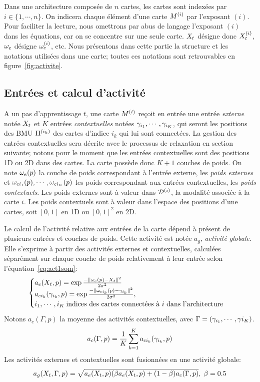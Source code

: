 Dans une architecture composée de $n$ cartes, les cartes sont indexées par $i \in \{1,\cdots,n\}$. On indicera chaque élément d'une carte $M^{({i})}$ par l'exposant $(i)$. Pour faciliter la lecture, nous omettrons par abus de langage l'exposant $(i)$ dans les équations, car on se concentre sur une seule carte. $X_t$ désigne donc $X_t^{({i})}$, $\omega_e$ désigne $\omega_e^{({i})}$, etc.
Nous présentons dans cette partie la structure et les notations utilisées dans une carte; toutes ces notations sont retrouvables en figure~\ref{fig:activite}.

\subsection{Entrées et calcul d'activité}
A un pas d'apprentissage $t$, une carte $M^{({i})}$ reçoit en entrée une entrée \emph{externe} notée $X_t$ et $K$ entrées \emph{contextuelles} notées $\gamma_{i_1},\cdots,\gamma_{i_K}$, qui seront les positions des BMU $\Pi^{({i_k})}$ des cartes d'indice $i_k$ qui lui sont connectées. La gestion des entrées contextuelles sera décrite avec le processus de relaxation en section suivante; notons pour le moment que les entrées contextuelles sont des positions 1D ou 2D dans des cartes. 
La carte possède donc $K+1$ couches de poids. On  note $\omega_e(p)$ la couche de poids correspondant à l'entrée externe, les \emph{poids externes} et $\omega_{ci_1}(p), \cdots, \omega_{ci_K}(p)$ les poids correspondant aux entrées contextuelles, les \emph{poids contextuels}. Les poids externes sont à valeur dans $\mathcal{D}^{({i})}$, la modalité associée à la carte $i$. Les poids contextuels sont à valeur dans l'espace des positions d'une cartes, soit $[0,1]$ en 1D ou $[0,1]^2$ en 2D.

Le calcul de l'activité relative aux entrées de la carte dépend à présent de plusieurs entrées et couches de poids. Cette activité est notée $a_g$, \emph{activité globale}.
Elle s'exprime à partir des activités externes et contextuelles, calculées séparément sur chaque couche de poids relativement à leur entrée selon l'équation~\ref{eq:act1som}:
\begin{equation}
\label{eq:activite}
\begin{cases}
a_e(X_t,p) = \exp\frac{-\lVert \omega_e(p)-X_t \rVert^2}{2\sigma^2} \\
a_{ci_k}(\gamma_{i_k},p) = \exp\frac{-\lVert \omega_{ci_k}(p)-\gamma_{i_k} \rVert ^2}{2\sigma^2}, \\
i_1, \cdots, i_K\: \text{indices des cartes connectées à $i$ dans l'architecture}
\end{cases}
\end{equation}
Notons $a_c(\Gamma,p)$ la moyenne des activités contextuelles, avec $\Gamma = (\gamma_{i_1}, \cdots, \gamma{i_K})$.
\begin{equation}
a_c(\Gamma,p) = \frac{1}{K}\sum_{k=1}^K {a_{ci_k}(\gamma_{i_k},p)}
\end{equation}
Les activités externes et contextuelles sont fusionnées en une activité globale:
\begin{equation}
\label{eq:global_act}
a_g(X_t,\Gamma,p) = \sqrt{a_e(X_t,p)(\beta a_e(X_t,p) + (1-\beta) a_c(\Gamma,p)}, \; \beta=0.5
\end{equation} 

